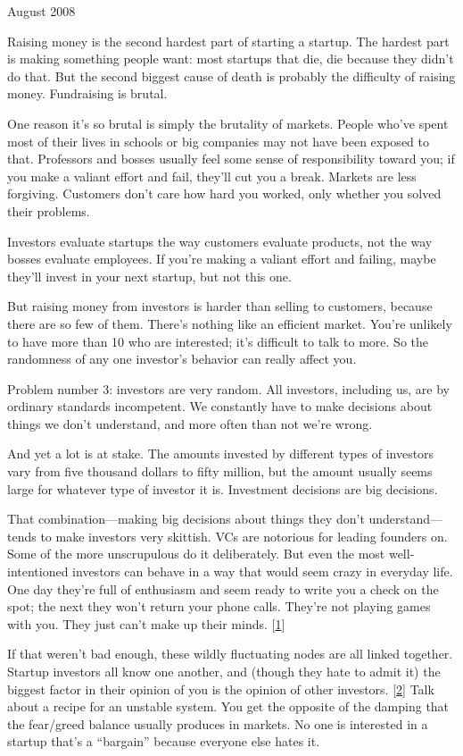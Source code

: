 August 2008

Raising money is the second hardest part of starting a startup. The
hardest part is making something people want: most startups that die,
die because they didn't do that. But the second biggest cause of death
is probably the difficulty of raising money. Fundraising is brutal.

One reason it's so brutal is simply the brutality of markets. People
who've spent most of their lives in schools or big companies may not
have been exposed to that. Professors and bosses usually feel some sense
of responsibility toward you; if you make a valiant effort and fail,
they'll cut you a break. Markets are less forgiving. Customers don't
care how hard you worked, only whether you solved their problems.

Investors evaluate startups the way customers evaluate products, not the
way bosses evaluate employees. If you're making a valiant effort and
failing, maybe they'll invest in your next startup, but not this one.

But raising money from investors is harder than selling to customers,
because there are so few of them. There's nothing like an efficient
market. You're unlikely to have more than 10 who are interested; it's
difficult to talk to more. So the randomness of any one investor's
behavior can really affect you.

Problem number 3: investors are very random. All investors, including
us, are by ordinary standards incompetent. We constantly have to make
decisions about things we don't understand, and more often than not
we're wrong.

And yet a lot is at stake. The amounts invested by different types of
investors vary from five thousand dollars to fifty million, but the
amount usually seems large for whatever type of investor it is.
Investment decisions are big decisions.

That combination---making big decisions about things they don't
understand---tends to make investors very skittish. VCs are notorious
for leading founders on. Some of the more unscrupulous do it
deliberately. But even the most well-intentioned investors can behave in
a way that would seem crazy in everyday life. One day they're full of
enthusiasm and seem ready to write you a check on the spot; the next
they won't return your phone calls. They're not playing games with you.
They just can't make up their minds. {[}\hyperref[f1n]{1}{]}

If that weren't bad enough, these wildly fluctuating nodes are all
linked together. Startup investors all know one another, and (though
they hate to admit it) the biggest factor in their opinion of you is the
opinion of other investors. {[}\hyperref[f2n]{2}{]} Talk about a recipe
for an unstable system. You get the opposite of the damping that the
fear/greed balance usually produces in markets. No one is interested in
a startup that's a ``bargain'' because everyone else hates it.

